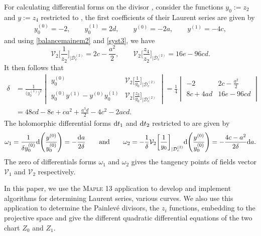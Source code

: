 \documentclass[pdftex]{sigma}
\numberwithin{equation}{section}
\begin{document}
 For calculating differential forms on the divisor
, consider the functions $y_0:=z_2$
and $y:=z_4$ restricted to , the
first coefficients of their Laurent series are given by
 \begin{gather*}
  y_0^{(0)}= -2, \qquad   y_0^{(1)}= 2d,\qquad
  y^{(0)}= -2a, \qquad   y^{(1)}=-4c,
 \end{gather*}
 and using \eqref{balancemainem2} and \eqref{syst3},
 we have \[\mathcal{V}_2\biggl[\frac{1}{z_2}\biggr]_{|\mathcal{D}_c^{(2)}}=2c-\frac{a^2}{2}, \qquad
 \mathcal{V}_2\biggl[\frac{z_4}{z_2}\biggr]_{|\mathcal{D}_c^{(2)}}=16e-96cd.\]
It then follows that
\begin{align*}
 \delta &{}= \frac{1}{\bigl(y_0^{(1)}\bigr)^2}
 \begin{vmatrix}
 y_0^{(0)} & \mathcal{V}_2\bigl[\frac{1}{y_0}\bigr]_{|\mathcal{D}_c^{(2)}} \\[1mm]
 y_0^{(0)}y^{(1)}-y^{(0)}y_0^{(1)} & \mathcal{V}_2\bigl[\frac{z_3}{y_0}\bigr]_{|\mathcal{D}_c^{(2)}}
 \end{vmatrix}
 = \frac{1}{4}
 \begin{vmatrix}
 -2 & 2c-\frac{a^2}{2} \\
 8c+4ad & 16e-96cd \\
 \end{vmatrix}\\
 &{}= 48cd-8e+ca^2+\frac{a^3d}{2}-4c^2-2acd.
\end{align*}
The holomorphic differential forms ${\rm d}t_1$ and ${\rm d}t_2$ restricted to
 are given by
\begin{gather*}
 \omega_1 = \frac{1}{\delta y_0^{(0)}}{\rm d}\Biggl(\frac{y^{(0)}}{y_0^{(0)}}\Biggr)=-\frac{{\rm d}a}{2\delta }
 \qquad \text{and} \qquad
 \omega_2 = -\frac{1}{\delta }\mathcal{V}_2\biggl[\frac{1}{y_0}\biggr]_{|\mathcal{D}_c^{(2)}}
 {\rm d}\Biggl(\frac{y^{(0)}}{y_0^{(0)}}\Biggr)=-\frac{4c-a^2}{2\delta}{\rm d}a.
\end{gather*}
The zero of differentials forms $\omega_1$ and $\omega_2$ gives the
tangency points of fields vector $\mathcal{V}_1$ and $\mathcal{V}_2$
respectively.

\begin{Remark}
In this paper, we use the \textsc{Maple} 13 application to develop and
implement algorithms for determining Laurent series, various curves.
We also use this application to determine the Painlev\'{e} divisors,
the $z_i$ functions, embedding to the projective space and give
the different quadratic differential equations of the two chart
$Z_0$ and $Z_1$.
\end{Remark}
\end{document}
